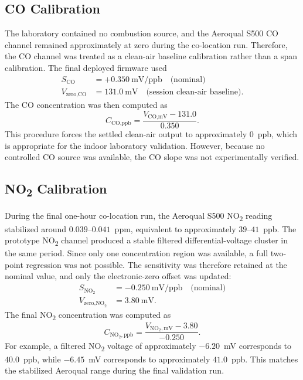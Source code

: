 \documentclass[conference]{IEEEtran}
\begin{document}
\subsection{CO Calibration}
The laboratory contained no combustion source, and the Aeroqual S500 CO channel remained approximately at zero during the co-location run. Therefore, the CO channel was treated as a clean-air baseline calibration rather than a span calibration. The final deployed firmware used
\begin{align*}
S_{\text{CO}}      &= +0.350~\text{mV/ppb} \quad\text{(nominal)} \\
V_{\text{zero,CO}} &= 131.0~\text{mV} \quad\text{(session clean-air baseline)}.
\end{align*}
The CO concentration was then computed as
\[
C_{\text{CO,ppb}} = \frac{V_{\text{CO,mV}} - 131.0}{0.350}.
\]
This procedure forces the settled clean-air output to approximately 0~ppb, which is appropriate for the indoor laboratory validation. However, because no controlled CO source was available, the CO slope was not experimentally verified.

\subsection{NO\textsubscript{2} Calibration}
During the final one-hour co-location run, the Aeroqual S500 NO\textsubscript{2} reading stabilized around $0.039$--$0.041$~ppm, equivalent to approximately $39$--$41$~ppb. The prototype NO\textsubscript{2} channel produced a stable filtered differential-voltage cluster in the same period. Since only one concentration region was available, a full two-point regression was not possible. The sensitivity was therefore retained at the nominal value, and only the electronic-zero offset was updated:
\begin{align*}
S_{\text{NO}_2}      &= -0.250~\text{mV/ppb} \quad\text{(nominal)} \\
V_{\text{zero,NO}_2} &= 3.80~\text{mV}.
\end{align*}
The final NO\textsubscript{2} concentration was computed as
\[
C_{\text{NO}_2,\text{ppb}} =
\frac{V_{\text{NO}_2,\text{mV}} - 3.80}{-0.250}.
\]
For example, a filtered NO\textsubscript{2} voltage of approximately $-6.20$~mV corresponds to $40.0$~ppb, while $-6.45$~mV corresponds to approximately $41.0$~ppb. This matches the stabilized Aeroqual range during the final validation run.
\end{document}
